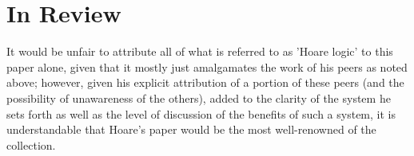 \documentclass[11pt]{article}
\begin{document}
\section{In Review}

It would be unfair to attribute all of what is referred to as 'Hoare logic' to
this paper alone, given that it mostly just amalgamates the work of his peers as
noted above; however, given his explicit attribution of a portion of these peers
(and the possibility of unawareness of the others), added to the clarity of the
system he sets forth as well as the level of discussion of the benefits of such
a system, it is understandable that Hoare's paper would be the most
well-renowned of the collection.

 

\end{document}
